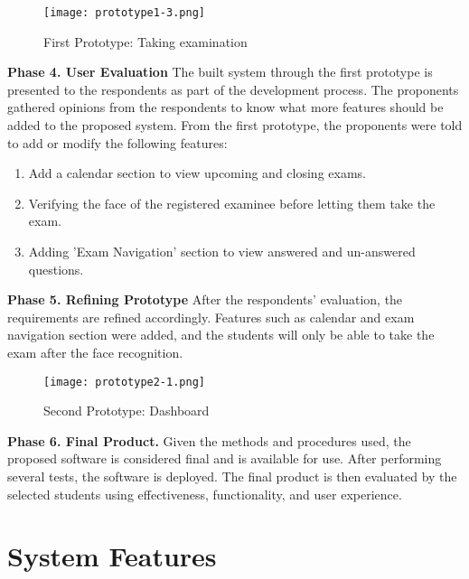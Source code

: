 \pagebreak

\begin{figure}[h!]
   \begin{center}
      \texttt{[image: prototype1-3.png]}
      \caption{First Prototype: Taking examination}
   \end{center}
\end{figure}

\textbf{Phase 4. User Evaluation}
The built system through the first prototype is presented to the respondents as part of the development process.
The proponents gathered opinions from the respondents to know what more features should be added to the proposed system.
From the first prototype, the proponents were told to add or modify the following features:

\begin{enumerate}
   \item Add a calendar section to view upcoming and closing exams.
   \item Verifying the face of the registered examinee before letting them take the exam.
   \item Adding 'Exam Navigation' section to view answered and un-answered questions.
\end{enumerate}

\textbf{Phase 5. Refining Prototype}
After the respondents' evaluation, the requirements are refined accordingly.
Features such as calendar and exam navigation section were added, and the students will only be able to take the exam after the face recognition.

\pagebreak

\begin{figure}[h!]
   \begin{center}
      \texttt{[image: prototype2-1.png]}
      \caption{Second Prototype: Dashboard}
   \end{center}
\end{figure}

\textbf{Phase 6. Final Product.}
Given the methods and procedures used, the proposed software is considered final and is available for use.
After performing several tests, the software is deployed.
The final product is then evaluated by the selected students using effectiveness, functionality, and user experience.

\section{System Features}


